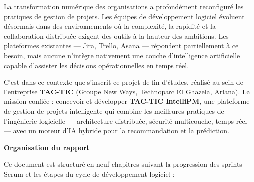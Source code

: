 La transformation numérique des organisations a profondément reconfiguré les pratiques
de gestion de projets. Les équipes de développement logiciel évoluent désormais dans
des environnements où la complexité, la rapidité et la collaboration distribuée exigent
des outils à la hauteur des ambitions. Les plateformes existantes — Jira, Trello,
Asana — répondent partiellement à ce besoin, mais aucune n'intègre nativement une
couche d'intelligence artificielle capable d'assister les décisions opérationnelles en
temps réel.

\bigskip
C'est dans ce contexte que s'inscrit ce projet de fin d'études, réalisé au sein de
l'entreprise \textbf{TAC-TIC} (Groupe New Ways, Technoparc El Ghazela, Ariana).
La mission confiée : concevoir et développer \textbf{TAC-TIC IntelliPM}, une plateforme
de gestion de projets intelligente qui combine les meilleures pratiques de l'ingénierie
logicielle — architecture distribuée, sécurité multicouche, temps réel — avec un moteur
d'IA hybride pour la recommandation et la prédiction.

\bigskip
\noindent\textbf{Organisation du rapport}

\medskip
Ce document est structuré en neuf chapitres suivant la progression des sprints Scrum
et les étapes du cycle de développement logiciel :

